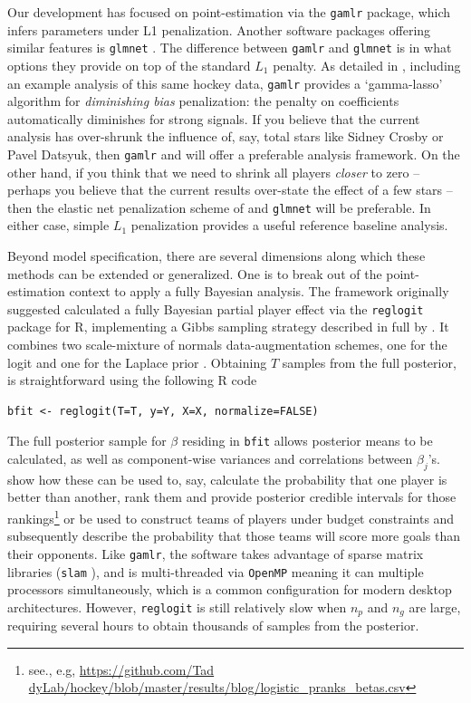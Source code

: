 Our development has focused on point-estimation via the {\tt gamlr} package,
which infers parameters under L1 penalization.  Another
software packages offering similar features is {\tt glmnet}
\cite{zou_regularization_2005}.  The difference between {\tt gamlr} and {\tt glmnet} is in what options they provide on top of the standard $L_1$ penalty.  As detailed in \cite{taddy_one-step_2015}, including an example analysis of this same hockey data, {\tt gamlr} provides a `gamma-lasso' algorithm for \textit{diminishing bias} penalization: the penalty on coefficients automatically diminishes for strong signals.  If you believe that the current analysis has over-shrunk the influence of, say, total stars like Sidney Crosby or Pavel Datsyuk, then {\tt gamlr} and \cite{taddy_one-step_2015} will offer a preferable analysis framework.  On the other hand, if you think that we need to shrink all players \textit{closer} to zero -- perhaps  you believe that the current results over-state the effect of a few stars -- then the elastic net penalization scheme of \cite{zou_regularization_2005} and {\tt glmnet} will be preferable.  In either case, simple $L_1$ penalization provides a useful reference baseline analysis.

Beyond model specification, there are several dimensions along which these
methods can be extended or generalized.  One is to break out of the
point-estimation context to apply a fully Bayesian analysis. The framework
originally suggested \cite{gramacy:jensen:taddy:2013} calculated a fully
Bayesian partial player effect via the {\tt reglogit} package for {\sf R},
implementing a Gibbs sampling strategy
\cite{gem:gem:1984} described in full by \cite{gra:pols:2012}.  It combines
two scale-mixture of normals data-augmentation schemes, one for the logit
\cite{holmes:held:2006} and one for the Laplace prior \cite{park:casella:2008}.
Obtaining $T$ samples from the full posterior, is straightforward using the
following {\sf R} code
\begin{verbatim}
bfit <- reglogit(T=T, y=Y, X=X, normalize=FALSE)
\end{verbatim}
The full posterior sample for $\beta$ residing in {\tt bfit} allows posterior
means to be calculated, as well as component-wise variances and correlations
between $\beta_j$'s.  \cite{gramacy:jensen:taddy:2013} show how these can be
used to, say, calculate the probability that one player is better than
another, rank them and provide posterior credible intervals for those
rankings\footnote{see., e.g, 
\url{https://github.com/Tad dyLab/hockey/blob/master/results/blog/logistic_pranks_betas.csv}
} or be used to construct teams of players under budget constraints and
subsequently describe the probability that those teams will score more goals
than their opponents.  Like {\tt gamlr}, the software takes advantage of
sparse matrix libraries ({\tt slam} \cite{slam}), and is multi-threaded via
{\tt OpenMP} meaning it can multiple processors simultaneously, which is a
common configuration for modern desktop architectures. However, {\tt reglogit}
is still relatively slow when $n_p$ and $n_g$ are large, requiring several
hours to obtain thousands of samples from the posterior.


